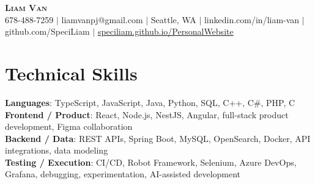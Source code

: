 \documentclass[letterpaper,11pt]{article}
\begin{document}

%
\begin{center}
    \textbf{\Huge \scshape Liam Van} \\ \vspace{1pt}
    \small 678-488-7259 $|$ \small {liamvanpj@gmail.com} $|$ Seattle, WA
 {{$|$ linkedin.com/in/liam-van} {$|$ github.com/SpeciLiam} {$|$ \href{https://speciliam.github.io/PersonalWebsite}{speciliam.github.io/PersonalWebsite}}}

\end{center}

\section{Technical Skills}
 \begin{itemize}[leftmargin=0.15in, label={}]
    \small{\item{
     \textbf{Languages}{: TypeScript, JavaScript, Java, Python, SQL, C++, C\#, PHP, C} \\
     \textbf{Frontend / Product}{: React, Node.js, NestJS, Angular, full-stack product development, Figma collaboration} \\
     \textbf{Backend / Data}{: REST APIs, Spring Boot, MySQL, OpenSearch, Docker, API integrations, data modeling} \\
     \textbf{Testing / Execution}{: CI/CD, Robot Framework, Selenium, Azure DevOps, Grafana, debugging, experimentation, AI-assisted development} \\
    }}
 \end{itemize}
%
\end{document}
